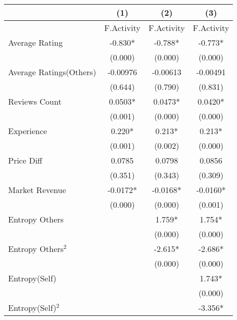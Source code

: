 \begin{table}[]
\centering
\begin{tabular}{@{}lccc@{}}
\toprule
                                 & (1)        & (2)        & (3)        \\ \midrule
                                 & F.Activity & F.Activity & F.Activity \\
Average Rating                   & -0.830*    & -0.788*    & -0.773*    \\
                                 & (0.000)    & (0.000)    & (0.000)    \\
Average Ratings(Others)          & -0.00976   & -0.00613   & -0.00491   \\
                                 & (0.644)    & (0.790)    & (0.831)    \\
Reviews Count                    & 0.0503*    & 0.0473*    & 0.0420*    \\
                                 & (0.001)    & (0.000)    & (0.000)    \\
Experience                       & 0.220*     & 0.213*     & 0.213*     \\
                                 & (0.001)    & (0.002)    & (0.000)    \\
Price Diff                       & 0.0785     & 0.0798     & 0.0856     \\
                                 & (0.351)    & (0.343)    & (0.309)    \\
Market Revenue                   & -0.0172*   & -0.0168*   & -0.0160*   \\
                                 & (0.000)    & (0.000)    & (0.001)    \\
Entropy Others                   &            & 1.759*     & 1.754*     \\
                                 &            & (0.000)    & (0.000)    \\
Entropy Others$^{2}$ &            & -2.615*    & -2.686*    \\
                                 &            & (0.000)    & (0.000)    \\
Entropy(Self)                    &            &            & 1.743*     \\
                                 &            &            & (0.000)    \\
Entropy(Self)$^{2}$ &            &            & -3.356*    \\

\end{tabular}
\end{table}

